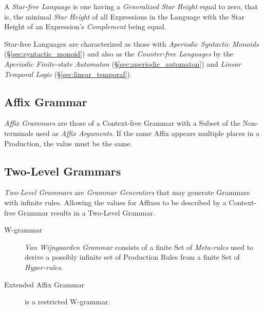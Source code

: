 A \emph{Star-free Language} is one having a \emph{Generalized Star
  Height} equal to zero, that is, the minimal \emph{Star Height} of
all Expressions in the Language with the Star Height of an
Expression's \emph{Complement} being equal.

Star-free Languages are characterized as those with \emph{Aperiodic
  Syntactic Monoids}\cite{schutzenberger65}
(\S\ref{sec:syntactic_monoid}) and also as the \emph{Counter-free
  Languages}\cite{mcnaughton-papert71} by the \emph{Aperiodic
  Finite-state Automaton} (\S\ref{sec:aperiodic_automaton}) and
\emph{Linear Temporal Logic} (\S\ref{sec:linear_temporal}).



\subsection{Affix Grammar}\label{sec:affix_grammar}

\emph{Affix Grammars} are those of a Context-free Grammar with a
Subset of the Non-terminals used as \emph{Affix Arguments}. If the
same Affix appears multiple places in a Production, the value must be
the same.



\subsection{Two-Level Grammars}\label{sec:two_level_grammar}

\emph{Two-Level Grammars} are \emph{Grammar Generators} that may
generate Grammars with infinite rules. Allowing the values for Affixes
to be described by a Context-free Grammar results in a Two-Level
Grammar.


\begin{description}
\item[W-grammar] \emph{Van Wijngaarden Grammar} consists of a finite
  Set of \emph{Meta-rules} used to derive a possibly infinite set of
  Production Rules from a finite Set of \emph{Hyper-rules}.
\item[Extended Affix Grammar] is a restricted W-grammar.
\end{description}



